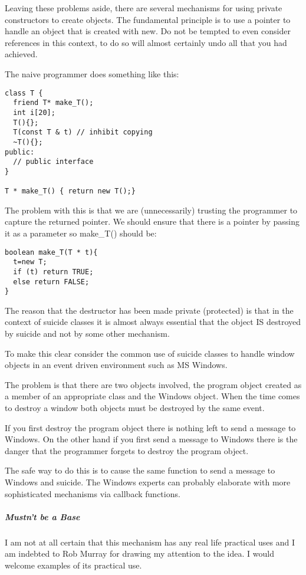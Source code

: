 \documentclass{book}
\begin{document}
Leaving these problems aside, there are several mechanisms for using private constructors to create objects.
The fundamental principle is to use a pointer to handle an object that is created with new.
Do not be tempted to even consider references in this context, to do so will almost certainly undo all that you had achieved.

The naive programmer does something like this:
\begin{lstlisting}
class T {
  friend T* make_T();
  int i[20];
  T(){};
  T(const T & t) // inhibit copying
  ~T(){}; 
public: 
  // public interface
} 

T * make_T() { return new T();}
\end{lstlisting}

The problem with this is that we are (unnecessarily) trusting the programmer to capture the returned pointer.
We should ensure that there is a pointer by passing it as a parameter so make\_T() should be:

\begin{lstlisting}
boolean make_T(T * t){ 
  t=new T;
  if (t) return TRUE; 
  else return FALSE;
}
\end{lstlisting}

The reason that the destructor has been made private (protected) is that in the context of suicide classes it is almost always essential that 
the object IS destroyed by suicide and not by some other mechanism.

To make this clear consider the common use of suicide classes to handle window objects in an event driven environment such as MS Windows.

The problem is that there are two objects involved, the program object created as a member of an appropriate class and the Windows object.
When the time comes to destroy a window both objects must be destroyed by the same event.

If you first destroy the program object there is nothing left to send a message to Windows.
On the other hand if you first send a message to Windows there is the danger that the programmer forgets to destroy the program object.

The safe way to do this is to cause the same function to send a message to Windows and suicide. The Windows experts can probably elaborate with more sophisticated mechanisms via callback functions.
\subparagraph{Mustn't be a Base}

I am not at all certain that this mechanism has any real life practical uses and I am indebted to Rob Murray for drawing my attention to the idea. I would welcome examples of its practical use.
\end{document}
